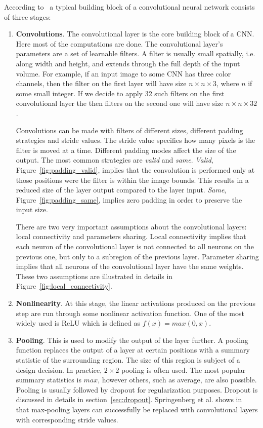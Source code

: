 \documentclass[a4paper, 11pt, table]{article}
\begin{document}
According to~\cite{dl_book} a typical building block of a convolutional neural network consists of three stages:
\begin{enumerate}
\item \textbf{Convolutions}. The convolutional layer is the core building block of a CNN. Here most of the computations are done. The convolutional layer's parameters are a set of learnable filters. A filter is usually small spatially, i.e. along width and height, and extends through the full depth of the input volume. For example, if an input image to some CNN has three color channels, then the filter on the first layer will have size $n \times n \times 3$, where $n$ if some small integer. If we decide to apply 32 such filters on the first convolutional layer the then filters on the second one will have size $n \times n \times 32$. 

Convolutions can be made with filters of different sizes, different padding strategies and stride values. The stride value specifies how many pixels is the filter is moved at a time. Different padding modes affect the size of the output. The most common strategies are \textit{valid} and \textit{same}. \textit{Valid}, Figure~\ref{fig:padding_valid}, implies that the convolution is performed only at those positions were the filter is within the image bounds. This results in a reduced size of the layer output compared to the layer input. \textit{Same}, Figure~\ref{fig:padding_same}, implies zero padding in order to preserve the input size.  

There are two very important assumptions about the convolutional layers: local connectivity and parameters sharing. Local connectivity implies that each neuron of the convolutional layer is not connected to all neurons on the previous one, but only to a subregion of the previous layer. Parameter sharing implies that all neurons of the convolutional layer have the same weights. These two assumptions are illustrated in details in Figure~\ref{fig:local_connectivity}.	

\item \textbf{Nonlinearity}. At this stage, the linear activations produced on the previous step are run through some nonlinear activation function. One of the most widely used is ReLU which is defined as $f(x) = max(0, x)$.
 
\item \textbf{Pooling}. This is used to modify the output of the layer further. A pooling function replaces the output of a layer at certain positions with a summary statistic of the surrounding region. The size of this region is subject of a design decision. In practice, $2 \times 2$ pooling is often used. The most popular summary statistics is $max$, however others, such as average, are also possible. Pooling is usually followed by dropout for regularization purposes. Dropout is discussed in details in section~\ref{sec:dropout}. Springenberg et al. shows in~\cite{DBLP:journals/corr/SpringenbergDBR14} that max-pooling layers can successfully be replaced with convolutional layers with corresponding stride values. 
\end{enumerate}
\end{document}
